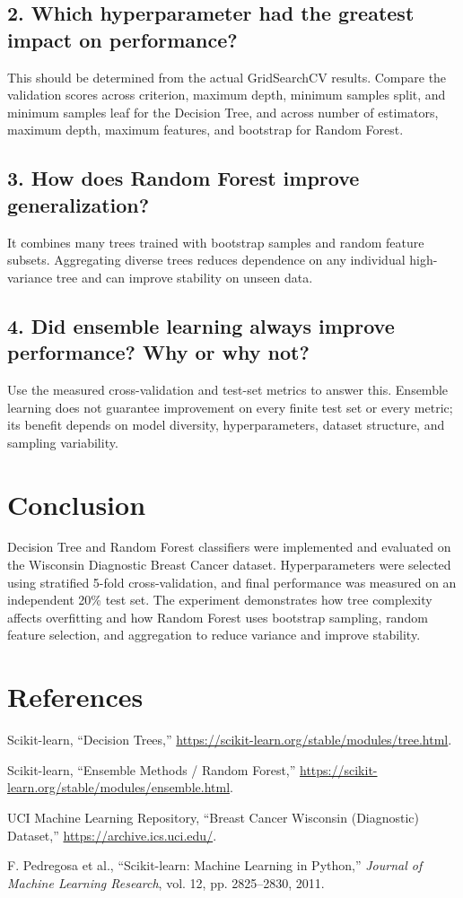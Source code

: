\documentclass[12pt,a4paper]{article}
\begin{document}
\subsection*{2. Which hyperparameter had the greatest impact on performance?}
This should be determined from the actual GridSearchCV results. Compare the validation scores across criterion, maximum depth, minimum samples split, and minimum samples leaf for the Decision Tree, and across number of estimators, maximum depth, maximum features, and bootstrap for Random Forest.

\subsection*{3. How does Random Forest improve generalization?}
It combines many trees trained with bootstrap samples and random feature subsets. Aggregating diverse trees reduces dependence on any individual high-variance tree and can improve stability on unseen data.

\subsection*{4. Did ensemble learning always improve performance? Why or why not?}
Use the measured cross-validation and test-set metrics to answer this. Ensemble learning does not guarantee improvement on every finite test set or every metric; its benefit depends on model diversity, hyperparameters, dataset structure, and sampling variability.

\section{Conclusion}
Decision Tree and Random Forest classifiers were implemented and evaluated on the Wisconsin Diagnostic Breast Cancer dataset. Hyperparameters were selected using stratified 5-fold cross-validation, and final performance was measured on an independent 20\% test set. The experiment demonstrates how tree complexity affects overfitting and how Random Forest uses bootstrap sampling, random feature selection, and aggregation to reduce variance and improve stability.

\section{References}
\begin{enumerate}[label={[}\arabic*{]}]
\item Scikit-learn, ``Decision Trees,'' \url{https://scikit-learn.org/stable/modules/tree.html}.
\item Scikit-learn, ``Ensemble Methods / Random Forest,'' \url{https://scikit-learn.org/stable/modules/ensemble.html}.
\item UCI Machine Learning Repository, ``Breast Cancer Wisconsin (Diagnostic) Dataset,'' \url{https://archive.ics.uci.edu/}.
\item F. Pedregosa et al., ``Scikit-learn: Machine Learning in Python,'' \textit{Journal of Machine Learning Research}, vol. 12, pp. 2825--2830, 2011.
\end{enumerate}
\end{document}

